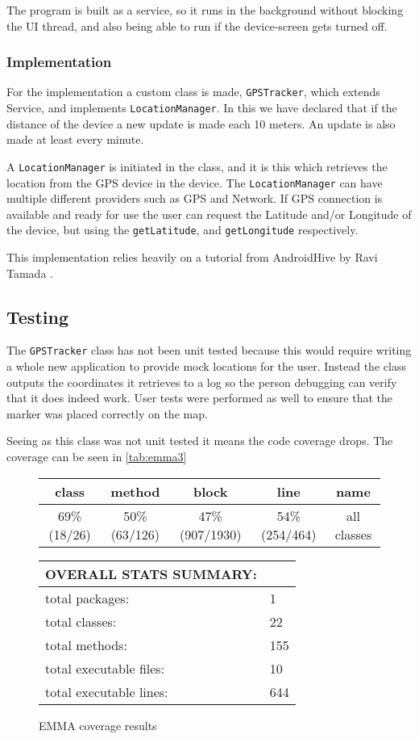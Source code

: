 The program is built as a service, so it runs in the background without blocking the UI thread, and also being able to run if the device-screen gets turned off.


\subsubsection{Implementation}
For the implementation a custom class is made, \texttt{GPSTracker}, which extends Service, and implements \texttt{LocationManager}.
In this we have declared that if the distance of the device a new update is made each 10 meters. An update is also made at least every minute.

A \texttt{LocationManager} is initiated in the class, and it is this which retrieves the location from the \ac{GPS} device in the device. The \texttt{LocationManager} can have multiple different providers such as \ac{GPS} and Network.
If \ac{GPS} connection is available and ready for use the user can request the Latitude and/or Longitude of the device, but using the \texttt{getLatitude}, and \texttt{getLongitude} respectively.

This implementation relies heavily on a tutorial from AndroidHive by Ravi Tamada \citep{androidhive}.

\subsection{Testing}
The \texttt{GPSTracker} class has not been unit tested because this would require writing a whole new application to provide mock locations for the user. Instead the class outputs the coordinates it retrieves to a log so the person debugging can verify that it does indeed work. User tests were performed as well to ensure that the marker was placed correctly on the map.

Seeing as this class was not unit tested it means the code coverage drops. The coverage can be seen in \autoref{tab:emma3}

\begin{figure}[ht]
\caption{EMMA coverage results}
\label{tab:emma3}
\begin{tabular}{| c | c | c | c | c |}
\hline
class & method & block & line & name \\ \hline
69\% (18/26) & 50\% (63/126) & 47\% (907/1930) & 54\% (254/464) & all classes \\
\hline
\end{tabular}
\vspace{10pt}

\begin{tabular}{| l | l |}
\hline
OVERALL STATS SUMMARY: & \\ \hline
total packages: & 1 \\
total classes: & 22 \\
total methods: & 155 \\
total executable files: & 10 \\
total executable lines: & 644 \\
\hline
\end{tabular}
\end{figure}